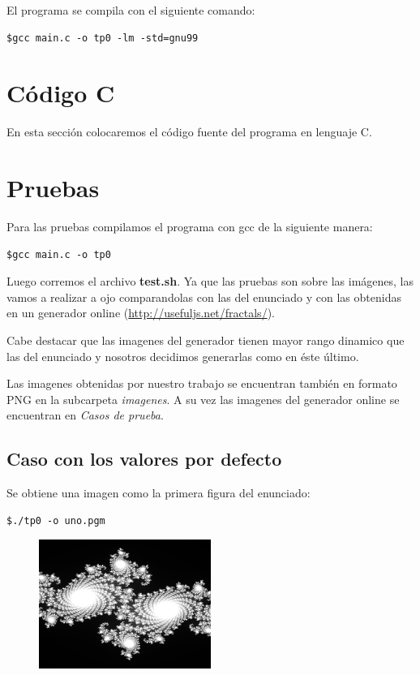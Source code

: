 \documentclass[a4paper,10pt]{article}
\begin{document}
El programa se compila con el siguiente comando:
\begin{lstlisting}[frame=single]
$gcc main.c -o tp0 -lm -std=gnu99
\end{lstlisting}

\section{C\'{o}digo C}

En esta secci\'{o}n colocaremos el c\'{o}digo fuente del programa en lenguaje C.



\newpage

\section{Pruebas}

Para las pruebas compilamos el programa con gcc de la siguiente manera:

\begin{lstlisting}[frame=single]
$gcc main.c -o tp0
\end{lstlisting}
Luego corremos el archivo \textbf{test.sh}.
Ya que las pruebas son sobre las imágenes, las vamos a realizar a ojo comparandolas con las del enunciado y con las obtenidas en un generador online (\url{http://usefuljs.net/fractals/}).

Cabe destacar que las imagenes del generador tienen mayor rango dinamico que las del enunciado y nosotros decidimos generarlas como en \'{e}ste \'{u}ltimo.

Las imagenes obtenidas por nuestro trabajo se encuentran tambi\'{e}n en formato PNG en la subcarpeta \textit{imagenes}.
A su vez las imagenes del generador online se encuentran en \textit{Casos de prueba}.

\subsection{Caso con los valores por defecto}
Se obtiene una imagen como la primera figura del enunciado:

\begin{lstlisting}[frame=single]
$./tp0 -o uno.pgm
\end{lstlisting}

\begin{figure}[H]
\begin{center}
\includegraphics[width=0.5\textwidth]{imagenes/uno.png}
\caption{} \label{uno}
\end{center}
\end{figure}
\end{document}
